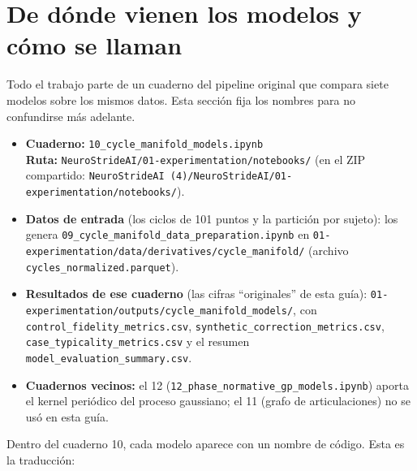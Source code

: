 \documentclass[11pt,a4paper]{article}
\begin{document}
\section{De dónde vienen los modelos y cómo se llaman}
\label{sec:modelos}

Todo el trabajo parte de un cuaderno del pipeline original que compara siete modelos sobre los mismos datos. Esta sección fija los nombres para no confundirse más adelante.

\begin{intuicion}
\raggedright
\begin{itemize}
\item \textbf{Cuaderno:} \texttt{10\_cycle\_manifold\_models.ipynb}\\
\textbf{Ruta:} \texttt{NeuroStrideAI/01-experimentation/notebooks/} (en el ZIP compartido: \texttt{NeuroStrideAI (4)/NeuroStrideAI/01-experimentation/notebooks/}).
\item \textbf{Datos de entrada} (los ciclos de 101 puntos y la partición por sujeto): los genera \texttt{09\_cycle\_manifold\_data\_preparation.ipynb} en \texttt{01-experimentation/data/derivatives/cycle\_manifold/} (archivo \texttt{cycles\_normalized.parquet}).
\item \textbf{Resultados de ese cuaderno} (las cifras ``originales'' de esta guía): \texttt{01-experimentation/outputs/cycle\_manifold\_models/}, con \texttt{control\_fidelity\_metrics.csv}, \texttt{synthetic\_correction\_metrics.csv}, \texttt{case\_typicality\_metrics.csv} y el resumen \texttt{model\_evaluation\_summary.csv}.
\item \textbf{Cuadernos vecinos:} el 12 (\texttt{12\_phase\_normative\_gp\_models.ipynb}) aporta el kernel periódico del proceso gaussiano; el 11 (grafo de articulaciones) no se usó en esta guía.
\end{itemize}
\end{intuicion}

Dentro del cuaderno 10, cada modelo aparece con un nombre de código. Esta es la traducción:
\end{document}
